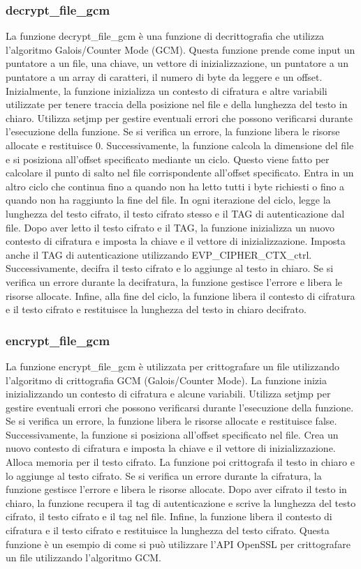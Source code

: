 \subsubsection{decrypt\_file\_gcm}
La funzione decrypt\_file\_gcm è una funzione di decrittografia che utilizza l’algoritmo Galois/Counter Mode (GCM). Questa funzione prende come input un puntatore a un file, una chiave, un vettore di inizializzazione, un puntatore a un puntatore a un array di caratteri, il numero di byte da leggere e un offset. Inizialmente, la funzione inizializza un contesto di cifratura e altre variabili utilizzate per tenere traccia della posizione nel file e della lunghezza del testo in chiaro. Utilizza setjmp per gestire eventuali errori che possono verificarsi durante l’esecuzione della funzione. Se si verifica un errore, la funzione libera le risorse allocate e restituisce 0.
Successivamente, la funzione calcola la dimensione del file e si posiziona all’offset specificato mediante un ciclo. Questo viene fatto per calcolare il punto di salto nel file corrispondente all'offset specificato. Entra in un altro ciclo che continua fino a quando non ha letto tutti i byte richiesti o fino a quando non ha raggiunto la fine del file. In ogni iterazione del ciclo, legge la lunghezza del testo cifrato, il testo cifrato stesso e il TAG di autenticazione dal file.
Dopo aver letto il testo cifrato e il TAG, la funzione inizializza un nuovo contesto di cifratura e imposta la chiave e il vettore di inizializzazione. Imposta anche il TAG di autenticazione utilizzando EVP\_CIPHER\_CTX\_ctrl. Successivamente, decifra il testo cifrato e lo aggiunge al testo in chiaro. Se si verifica un errore durante la decifratura, la funzione gestisce l’errore e libera le risorse allocate.
Infine, alla fine del ciclo, la funzione libera il contesto di cifratura e il testo cifrato e restituisce la lunghezza del testo in chiaro decifrato.
\subsubsection{encrypt\_file\_gcm}
La funzione encrypt\_file\_gcm è utilizzata per crittografare un file utilizzando l’algoritmo di crittografia GCM (Galois/Counter Mode). La funzione inizia inizializzando un contesto di cifratura e alcune variabili. Utilizza setjmp per gestire eventuali errori che possono verificarsi durante l’esecuzione della funzione. Se si verifica un errore, la funzione libera le risorse allocate e restituisce false.
Successivamente, la funzione si posiziona all’offset specificato nel file. Crea un nuovo contesto di cifratura e imposta la chiave e il vettore di inizializzazione. Alloca memoria per il testo cifrato.
La funzione poi crittografa il testo in chiaro e lo aggiunge al testo cifrato. Se si verifica un errore durante la cifratura, la funzione gestisce l’errore e libera le risorse allocate.
Dopo aver cifrato il testo in chiaro, la funzione recupera il tag di autenticazione e scrive la lunghezza del testo cifrato, il testo cifrato e il tag nel file.
Infine, la funzione libera il contesto di cifratura e il testo cifrato e restituisce la lunghezza del testo cifrato. Questa funzione è un esempio di come si può utilizzare l’API OpenSSL per crittografare un file utilizzando l’algoritmo GCM.


